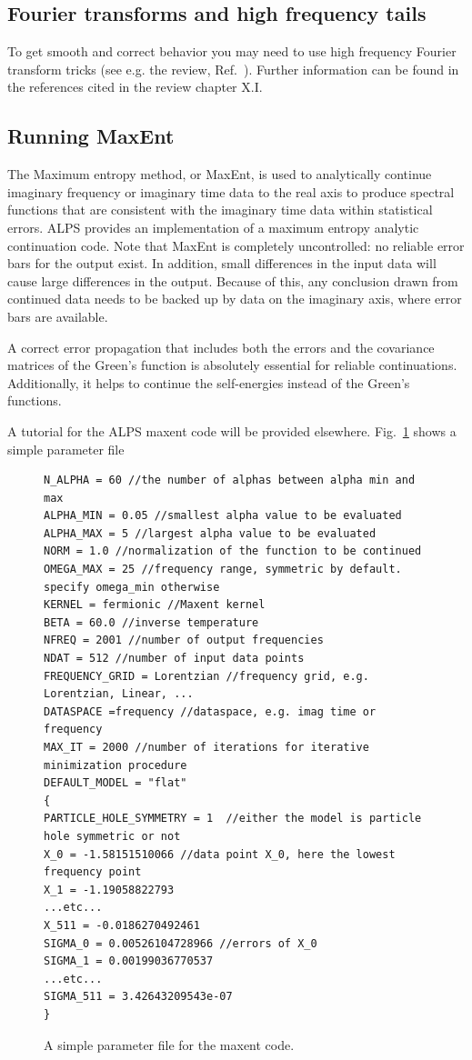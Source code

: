 \documentclass[aps,prb,floatfix,superscriptaddress,twocolumn,notitlepage]{revtex4-1}
\begin{document}
\subsection{Fourier transforms and high frequency tails}
To get smooth and correct behavior you may need to use high frequency Fourier transform tricks (see e.g. the review, Ref.~). Further information can be found in the references cited in the review chapter X.I.

\subsection{Running MaxEnt}
The Maximum entropy method, or MaxEnt, is used to analytically continue imaginary frequency or imaginary time data to the real axis to produce spectral functions that are consistent with the imaginary time data within  statistical errors.\cite{Jarrell96} ALPS provides an implementation of a maximum entropy analytic continuation code. Note that MaxEnt is completely uncontrolled: no reliable error bars for the output exist. In addition, small differences in the input data will cause large differences in the output. Because of this, any conclusion drawn from continued data needs to be backed up by data on the imaginary axis, where error bars are available.

A correct error propagation that includes both the errors and the covariance matrices of the Green's function is absolutely essential for reliable continuations. Additionally, it helps to continue the self-energies instead of the Green's functions\cite{Wang09gap}.

A tutorial for the ALPS maxent code will be provided elsewhere. Fig.~\ref{pfile} shows a simple parameter file

\begin{figure}
\begin{verbatim}
N_ALPHA = 60 //the number of alphas between alpha min and max
ALPHA_MIN = 0.05 //smallest alpha value to be evaluated
ALPHA_MAX = 5 //largest alpha value to be evaluated
NORM = 1.0 //normalization of the function to be continued
OMEGA_MAX = 25 //frequency range, symmetric by default. specify omega_min otherwise
KERNEL = fermionic //Maxent kernel
BETA = 60.0 //inverse temperature
NFREQ = 2001 //number of output frequencies
NDAT = 512 //number of input data points
FREQUENCY_GRID = Lorentzian //frequency grid, e.g. Lorentzian, Linear, ...
DATASPACE =frequency //dataspace, e.g. imag time or frequency
MAX_IT = 2000 //number of iterations for iterative minimization procedure
DEFAULT_MODEL = "flat"
{
PARTICLE_HOLE_SYMMETRY = 1  //either the model is particle hole symmetric or not
X_0 = -1.58151510066 //data point X_0, here the lowest frequency point
X_1 = -1.19058822793
...etc...
X_511 = -0.0186270492461
SIGMA_0 = 0.00526104728966 //errors of X_0
SIGMA_1 = 0.00199036770537
...etc...
SIGMA_511 = 3.42643209543e-07
}
\end{verbatim}
\caption{A simple parameter file for the maxent code.\label{pfile}}
\end{figure}
\end{document}
